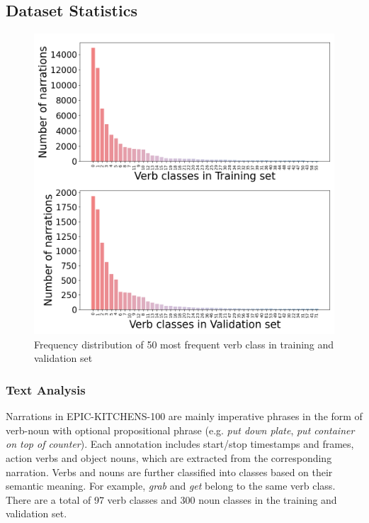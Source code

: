 
\subsection{Dataset Statistics}

\begin{figure}[t]
    \centering
    \includegraphics[scale=0.25]{figures/verb_count.png}
    \caption{Frequency distribution of 50 most frequent verb class in training and validation set}
    \label{fig:verb_freq}
\end{figure}

\subsubsection{Text Analysis}
Narrations in EPIC-KITCHENS-100 are mainly imperative phrases in the form of verb-noun with optional propositional phrase (e.g. \textit{put down plate}, \textit{put container on top of counter}). Each annotation includes start/stop timestamps and frames, action verbs and object nouns, which are extracted from the corresponding narration. Verbs and nouns are further classified into classes based on their semantic meaning. For example, \textit{grab} and \textit{get} belong to the same verb class.  There are a total of 97 verb classes and 300 noun classes in the training and validation set.

